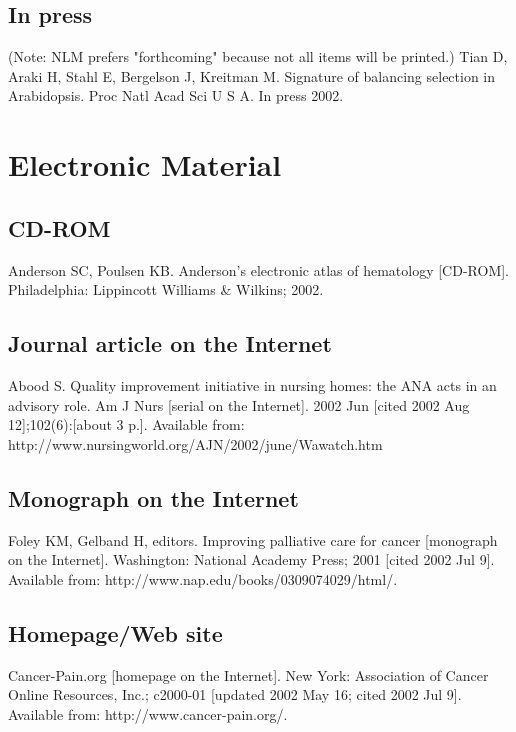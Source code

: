 \documentclass[a4paper,10pt]{article}
\begin{document}
\subsection{In press}

(Note: NLM prefers "forthcoming" because not all items will be printed.)
\linebreak
Tian D, Araki H, Stahl E, Bergelson J, Kreitman M. Signature of balancing selection in Arabidopsis. Proc Natl Acad Sci U S A. In press 2002.\cite{ tian.araki.ea:signature}

\section{Electronic Material}

\subsection{CD-ROM}

Anderson SC, Poulsen KB. Anderson's electronic atlas of hematology [CD-ROM]. Philadelphia: Lippincott Williams \& Wilkins; 2002.\cite{anderson.poulsen:andersons}

\subsection{Journal article on the Internet}

Abood S. Quality improvement initiative in nursing homes: the ANA acts in an advisory role. Am J Nurs [serial on the Internet]. 2002 Jun [cited 2002 Aug 12];102(6):[about 3 p.]. Available from: http://www.nursingworld.org/AJN/2002/june/Wawatch.htm\cite{abood:quality}

\subsection{Monograph on the Internet}

Foley KM, Gelband H, editors. Improving palliative care for cancer [monograph on the Internet]. Washington: National Academy Press; 2001 [cited 2002 Jul 9]. Available from: http://www.nap.edu/books/0309074029/html/.\cite{foley.gelband:improving}

\subsection{Homepage/Web site}

Cancer-Pain.org [homepage on the Internet]. New York: Association of Cancer Online Resources, Inc.; c2000-01 [updated 2002 May 16; cited 2002 Jul 9]. Available from: http://www.cancer-pain.org/.\cite{cancer-pain}
\end{document}
